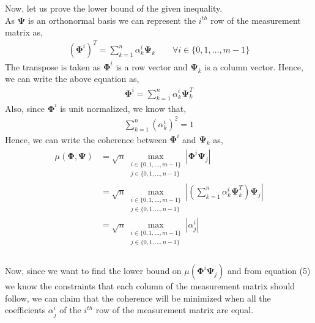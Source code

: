 \documentclass[12pt]{article}
\begin{document}
Now, let us prove the lower bound of the given inequality. \\
As $\boldsymbol{\Psi}$ is an orthonormal basis we can represent the $i^{th}$ row  of the measurement matrix as,
\begin{gather*}
(\boldsymbol{\Phi}^i)^T = \sum_{k=1}^n \alpha_k^i \boldsymbol{\Psi}_k \quad \quad \forall i \in \{0,1,\dots,m-1\}
\end{gather*}
The transpose is taken as $\boldsymbol{\Phi}^i$ is a row vector and $\boldsymbol{\Psi}_k$ is a column vector. Hence, we can write the above equation as,
\begin{gather*}
\boldsymbol{\Phi}^i = \sum_{k=1}^n \alpha_k^i \boldsymbol{\Psi}_k^T 
\end{gather*}
Also, since $\boldsymbol{\Phi}^i$ is unit normalized, we know that,
\begin{gather}
    \sum_{k = 1}^n (\alpha_k^i)^2 = 1
\end{gather}
Hence, we can write the coherence between $\boldsymbol{\Phi}^i$ and $\boldsymbol{\Psi}_k$ as,
\begin{gather*}
    \begin{align*}
    \mu(\boldsymbol{\Phi},\boldsymbol{\Psi}) &=  \sqrt{n} \max_{\substack{i \in \{0,1,...,m-1\}  \\ j \in \{0,1,...,n-1\} }} \left|\boldsymbol{\Phi}^i \boldsymbol{\Psi}_j \right| \\
    &= \sqrt{n} \max_{\substack{i \in \{0,1,...,m-1\}  \\ j \in \{0,1,...,n-1\} }} \left|(\sum_{k=1}^n \alpha_k^i \boldsymbol{\Psi}_k^T) \boldsymbol{\Psi}_j \right|\\
    &= \sqrt{n} \max_{\substack{i \in \{0,1,...,m-1\}  \\ j \in \{0,1,...,n-1\} }} \left|\alpha_j^i \right|\\
    \end{align*}
\end{gather*}

Now, since we want to find the lower bound on $\mu (\boldsymbol{\Phi}^i \boldsymbol{\Psi}_j)$ and from equation (5) we know the constraints that each column of the measurement matrix should follow, we can claim that the coherence will be minimized when all the coefficients $ \alpha_j^i $ of the $i^{th}$ row of the measurement matrix are equal. \\
\end{document}
